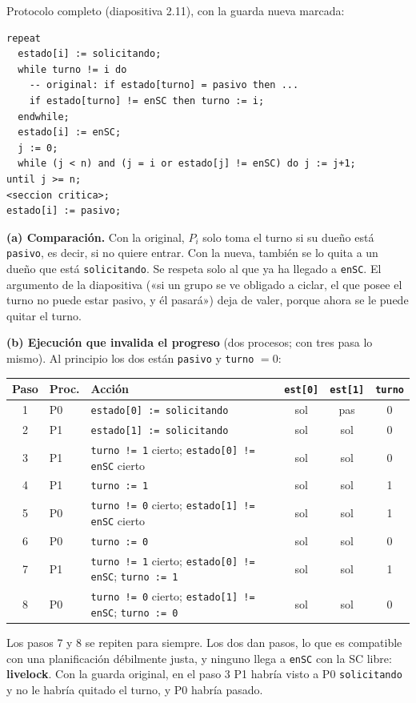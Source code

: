 \documentclass[11pt,a4paper,oneside]{report}
\begin{document}
\begin{solucion}
Protocolo completo (diapositiva 2.11), con la guarda nueva marcada:
\begin{lstlisting}
repeat
  estado[i] := solicitando;
  while turno != i do
    -- original: if estado[turno] = pasivo then ...
    if estado[turno] != enSC then turno := i;
  endwhile;
  estado[i] := enSC;
  j := 0;
  while (j < n) and (j = i or estado[j] != enSC) do j := j+1;
until j >= n;
<seccion critica>;
estado[i] := pasivo;
\end{lstlisting}
\textbf{(a) Comparación.} Con la original, $P_i$ solo toma el turno si su dueño está \texttt{pasivo}, es decir, si
no quiere entrar. Con la nueva, también se lo quita a un dueño que está \texttt{solicitando}. Se respeta solo al que
ya ha llegado a \texttt{enSC}. El argumento de la diapositiva («si un grupo se ve obligado a ciclar, el que posee el
turno no puede estar pasivo, y él pasará») deja de valer, porque ahora se le puede quitar el turno.

\textbf{(b) Ejecución que invalida el progreso} (dos procesos; con tres pasa lo mismo). Al principio los dos están
\texttt{pasivo} y \texttt{turno} $= 0$:
\begin{center}\footnotesize\setlength{\tabcolsep}{3pt}
\begin{tabular}{cllccc}
\toprule
\textbf{Paso} & \textbf{Proc.} & \textbf{Acción} & \texttt{est[0]} & \texttt{est[1]} & \texttt{turno} \\ \midrule
1 & P0 & \texttt{estado[0] := solicitando} & sol & pas & 0 \\
2 & P1 & \texttt{estado[1] := solicitando} & sol & sol & 0 \\
3 & P1 & \texttt{turno != 1} cierto; \texttt{estado[0] != enSC} cierto & sol & sol & 0 \\
4 & P1 & \texttt{turno := 1} & sol & sol & 1 \\
5 & P0 & \texttt{turno != 0} cierto; \texttt{estado[1] != enSC} cierto & sol & sol & 1 \\
6 & P0 & \texttt{turno := 0} & sol & sol & 0 \\
7 & P1 & \texttt{turno != 1} cierto; \texttt{estado[0] != enSC}; \texttt{turno := 1} & sol & sol & 1 \\
8 & P0 & \texttt{turno != 0} cierto; \texttt{estado[1] != enSC}; \texttt{turno := 0} & sol & sol & 0 \\
\bottomrule
\end{tabular}
\end{center}
Los pasos 7 y 8 se repiten para siempre. Los dos dan pasos, lo que es compatible con una planificación débilmente
justa, y ninguno llega a \texttt{enSC} con la SC libre: \textbf{livelock}. Con la guarda original, en el paso 3 P1
habría visto a P0 \texttt{solicitando} y no le habría quitado el turno, y P0 habría pasado.


\end{solucion}
\end{document}

